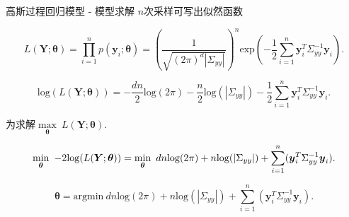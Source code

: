 \documentclass[10pt,mathserif]{beamer}
\theoremstyle{definition}
\numberwithin{equation}{section} %
\begin{document}
    \begin{frame}[fragile]{高斯过程回归模型 - 模型求解}
        $n$次采样可写出似然函数

        \begin{equation}
            L(\boldsymbol{Y};\boldsymbol{\theta})=\prod^{n}_{i=1}p(\boldsymbol{y}_{i};\boldsymbol{\theta})= (\frac{1}{\sqrt{(2\pi)^{d}|\Sigma_{yy}|}})^{n}\mathrm{exp}\left(-\frac{1}{2}\sum\limits^{n}_{i=1}\boldsymbol{y}^{T}_{i}\Sigma_{yy}^{-1}\boldsymbol{y}_{i}\right).
        \end{equation}

        \begin{equation}
            \mathrm{log}(L(\boldsymbol{Y};\boldsymbol{\theta})) = -\frac{dn}{2}\mathrm{log}(2\pi) - \frac{n}{2}\mathrm{log}(|\Sigma_{yy}|) - \frac{1}{2}\sum\limits^{n}_{i=1}\boldsymbol{y}^{T}_{i}\Sigma_{yy}^{-1}\boldsymbol{y}_{i}.
        \end{equation}

        为求解$\max\limits_{\boldsymbol{\theta}} \ L(\boldsymbol{Y};\boldsymbol{\theta}).$

        \begin{equation}
            \min_{\boldsymbol{\theta}} \ -2\mathrm{log}(L(\boldsymbol{Y};\boldsymbol{\theta})) = \min_{\boldsymbol{\theta}} \ dn\mathrm{log}(2\pi)+n\mathrm{log}(|\Sigma_{yy}|)+\sum\limits^{n}_{i=1}(\boldsymbol{y}_{i}^{T}\Sigma_{yy}^{-1}\boldsymbol{y}_{i}). \notag
        \end{equation}

        \begin{equation}
            \boldsymbol{\theta}=\mathrm{argmin} \ dn\mathrm{log}(2\pi)+n\mathrm{log}(|\Sigma_{yy}|)+\sum\limits^{n}_{i=1}(\boldsymbol{y}_{i}^{T}\Sigma_{yy}^{-1}\boldsymbol{y}_{i}).
        \end{equation}
    \end{frame}
\end{document}
